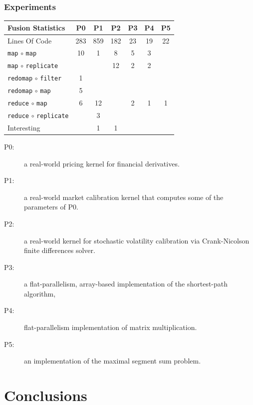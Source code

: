 \documentclass{beamer}
\begin{document}
\begin{frame}[fragile,t]
  \frametitle{Experiments}

{\tiny
\begin{center}
\begin{tabular}{l|c|c|c|c|c|c}
Fusion Statistics & P0 & P1 & P2 & P3 & P4 & P5 \\\hline
Lines Of Code          & 283 & 859 & 182 & 23 & 19 & 22\\\hline\hline
{\tt map} $\circ$ {\tt map}          & 10 & 1  & 8  & 5 & 3  &   \\\hline
{\tt map} $\circ$ {\tt replicate}    &    &    & 12 & 2 & 2  &   \\\hline
{\tt redomap} $\circ$ {\tt filter}   & 1  &    &    &   &    &   \\\hline
{\tt redomap} $\circ$ {\tt map}      & 5  &    &    &   &    &   \\\hline
{\tt reduce} $\circ$ {\tt map}       & 6  & 12 &    & 2 & 1  & 1 \\\hline
{\tt reduce} $\circ$ {\tt replicate} &    & 3  &    &   &    &   \\\hline\hline
Interesting            &    & 1  & 1  &   &    &   \\\hline
\end{tabular}
\end{center}
}

\begin{description}
\item[P0:] a real-world pricing kernel for financial derivatives.
\item[P1:] a real-world market calibration kernel that computes some
  of the parameters of P0.
\item[P2:] a real-world kernel for stochastic volatility calibration
  via Crank-Nicolson finite differences solver.
\item[P3:] a flat-parallelism, array-based implementation of the
  shortest-path algorithm,
\item[P4:] flat-parallelism implementation of matrix multiplication.
\item[P5:] an implementation of the maximal segment sum problem.
\end{description}

\end{frame}

\section{Conclusions}
\end{document}
